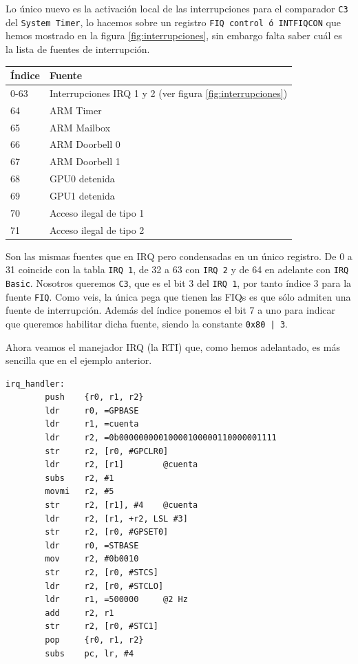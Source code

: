 Lo único nuevo es la activación local de las interrupciones para el comparador {\tt C3} del
{\tt System Timer}, lo hacemos sobre un registro {\tt FIQ control ó INTFIQCON} que hemos
mostrado en la figura \ref{fig:interrupciones}, sin embargo falta saber cuál es la lista
de fuentes de interrupción.

\begin{longtable}{ p{2cm} | p{6cm}}
\hline
{\bf Índice} & {\bf Fuente} \\ \hline
0-63  & Interrupciones IRQ 1 y 2 (ver figura \ref{fig:interrupciones})  \\ \hline
64    & ARM Timer  \\ \hline
65    & ARM Mailbox \\ \hline
66    & ARM Doorbell 0 \\ \hline
67    & ARM Doorbell 1 \\ \hline
68    & GPU0 detenida \\ \hline
69    & GPU1 detenida \\ \hline
70    & Acceso ilegal de tipo 1 \\ \hline
71    & Acceso ilegal de tipo 2 \\ \hline
\end{longtable}

Son las mismas fuentes que en IRQ pero condensadas en un único registro. De 0 a 31 coincide
con la tabla {\tt IRQ 1}, de 32 a 63 con {\tt IRQ 2} y de 64 en adelante con {\tt IRQ Basic}.
Nosotros queremos {\tt C3}, que es el bit 3 del {\tt IRQ 1}, por tanto índice 3 para la fuente
{\tt FIQ}. Como veis, la única pega que tienen las FIQs es que sólo admiten una fuente de
interrupción. Además del índice ponemos el bit 7 a uno para indicar que queremos habilitar
dicha fuente, siendo la constante {\tt 0x80 | 3}.

Ahora veamos el manejador IRQ (la RTI) que, como hemos adelantado, es más sencilla que en el
ejemplo anterior.

\begin{lstlisting}
irq_handler:
        push    {r0, r1, r2}
        ldr     r0, =GPBASE
        ldr     r1, =cuenta
        ldr     r2, =0b00000000010000100000110000001111
        str     r2, [r0, #GPCLR0]
        ldr     r2, [r1]        @cuenta
        subs    r2, #1
        movmi   r2, #5
        str     r2, [r1], #4    @cuenta
        ldr     r2, [r1, +r2, LSL #3]
        str     r2, [r0, #GPSET0]
        ldr     r0, =STBASE
        mov     r2, #0b0010
        str     r2, [r0, #STCS]
        ldr     r2, [r0, #STCLO]
        ldr     r1, =500000     @2 Hz
        add     r2, r1
        str     r2, [r0, #STC1]
        pop     {r0, r1, r2}
        subs    pc, lr, #4
\end{lstlisting}


